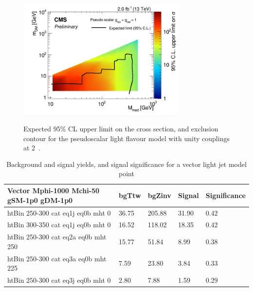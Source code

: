\begin{figure}
\begin{center}
\includegraphics[width=0.75\textwidth]{figures/DMplots/dm_P_g1p0_2p0fb_2dlimits.png} \\
\caption{Expected 95\% CL upper limit on the cross section, and exclusion
contour for the pseudoscalar light flavour model with unity couplings at 2~\ifb.}
\label{fig:dm_P_g1_2fb_2dlimits}
\end{center}
\end{figure}

\clearpage

\begin{table}
\small
\begin{center}
\caption{Background and signal yields, and signal significance for a vector light jet model point}
\label{tab:MSB_V_g1_2fb}
\begin{tabular}{|l|l|l|l|l|}
\textbf{Vector Mphi-1000 Mchi-50 gSM-1p0 gDM-1p0}   &  bgTtw    &  bgZinv   &  Signal &
Significance \\ 
\hline
htBin 250-300 cat eq1j eq0b mht 0 &     36.75    &  205.88   &  31.90   &0.42 \\ 
htBin 300-350 cat eq1j eq0b mht 0 &     16.52    &  118.02   &  18.35   &0.42 \\ 
htBin 250-300 cat eq2a eq0b mht 250 &   15.77    &  51.84    &  8.99    &0.38 \\ 
htBin 250-300 cat eq3a eq0b mht 225 &   7.59     &  23.80    &  3.84    &0.33 \\ 
htBin 250-300 cat eq3j eq0b mht 0 &     2.80     &  7.88     &  1.59    &0.29 \\ 
\end{tabular}
\end{center}
\end{table}

